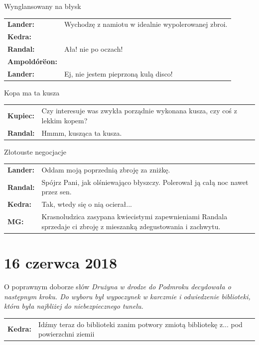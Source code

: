 \documentclass[10pt,twoside,twocolumn]{book}
\begin{document}
\begin{rpg-quotebox}{Wynglansowany na błysk}
   \begin{tabularx}{\columnwidth}{lX}
      \textbf{Lander:} & Wychodzę z namiotu w idealnie wypolerowanej zbroi.\\
      \textbf{Kedra:} & \multirow{3}{*}{Ała! nie po oczach!}\\
      \textbf{Randal:} & \\
      \textbf{Ampoldórëon:} & \\
      \textbf{Lander:} & Ej, nie jestem pieprzoną kulą disco!\\
   \end{tabularx}
\end{rpg-quotebox}


\begin{rpg-quotebox}{Kopa ma ta kusza}
   \begin{tabularx}{\columnwidth}{lX}
      \textbf{Kupiec:} & Czy interesuje was zwykła porządnie wykonana kusza, czy coś z lekkim kopem?\\
      \textbf{Randal:} & Hmmm, kusząca ta kusza.\\
   \end{tabularx}
\end{rpg-quotebox}


\begin{rpg-quotebox}{Złotouste negocjacje}
   \begin{tabularx}{\columnwidth}{lX}
      \textbf{Lander:} & Oddam moją poprzednią zbroję za zniżkę.\\
      \textbf{Randal:} & Spójrz Pani, jak olśniewająco błyszczy. Polerował ją całą noc nawet przez sen.\\
      \textbf{Kedra:} & Tak, wtedy się o nią ocierał...\\
      \textbf{MG:} & Krasnoludzica zasypana kwiecistymi zapewnieniami Randala sprzedaje ci zbroję z mieszanką zdegustowania i zachwytu.\\
   \end{tabularx}
\end{rpg-quotebox}


\section*{16 czerwca 2018}


\begin{rpg-quotebox}{O poprawnym doborze słów}
   \textit{Drużyna w drodze do Podmroku decydowała o następnym kroku. Do wyboru był wypoczynek w karczmie i odwiedzenie biblioteki, która była najbliżej do niebezpiecznego tunelu.}\\

   \begin{tabularx}{\columnwidth}{lX}
      \textbf{Kedra:} & Idźmy teraz do biblioteki zanim potwory zmiotą bibliotekę z... pod powierzchni ziemii\\
   \end{tabularx}
\end{rpg-quotebox}
\end{document}

